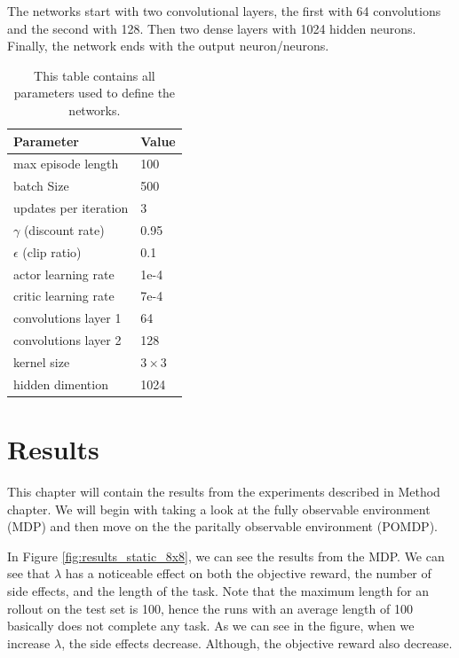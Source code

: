 \documentclass[12pt,A4]{report}
\theoremstyle{definition}
\begin{document}
The networks start with two convolutional layers, the first with 64 convolutions and the second with 128. Then two dense layers with 1024 hidden neurons. Finally, the network ends with the output neuron/neurons.

\begin{table}[H]
  \centering
  \begin{tabular}{l|l}
    Parameter & Value \\ \hline
    max episode length & 100\\
    batch Size & 500 \\
    updates per iteration & 3 \\
    $\gamma$ (discount rate) & 0.95 \\
    $\epsilon$ (clip ratio) & 0.1 \\
    actor learning rate & 1e-4 \\
    critic learning rate & 7e-4 \\
    convolutions layer 1 & 64 \\
    convolutions layer 2 & 128 \\
    kernel size & $3 \times 3$\\
    hidden dimention & 1024 \\
  \end{tabular}
  \label{tab:train_parms}
  \caption{This table contains all parameters used to define the networks.}
\end{table}


\chapter{Results}
This chapter will contain the results from the experiments described in Method chapter. We will begin with taking a look at the fully observable environment (MDP) and then move on the the paritally observable environment (POMDP).

In Figure \ref{fig:results_static_8x8}, we can see the results from the MDP. We can see that $\lambda$ has a noticeable effect on both the objective reward, the number of side effects, and the length of the task. Note that the maximum length for an rollout on the test set is 100, hence the runs with an average length of 100 basically does not complete any task. As we can see in the figure, when we increase $\lambda$, the side effects decrease. Although, the objective reward also decrease. 
\end{document}

